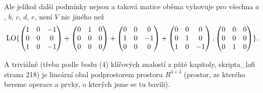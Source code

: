 \documentclass[12pt]{article}					%
\begin{document}
\begin{priklad}[6.1]
\begin{reseni}
            Ale jelikož další podmínky nejsou a taková matice oběma vyhovuje pro všechna $a$, $b$, $c$, $d$, $e$, není $V$ nic jiného než
            $$ \operatorname{LO}\{\begin{pmatrix} 1 & 0 & -1 \\ 0 & 0 & 0 \\ 1 & 0 & -1  \end{pmatrix} + \begin{pmatrix} 0 & 1 & 0 \\ 0 & 0 & 0 \\ 0 & 0 & 0 \end{pmatrix} + \begin{pmatrix} 0 & 0 & 0 \\ 1 & 0 & -1 \\ 0 & 0 & 0 \end{pmatrix} + \begin{pmatrix} 0 & 0 & 0 \\ 0 & 1 & 0 \\ 1 & 0 & -1  \end{pmatrix}, \begin{pmatrix} 0 & 0 & 0 \\ 0 & 0 & 0 \\ 0 & 1 & 0 \end{pmatrix}\}. $$

            A triviálně (třeba podle bodu (4) klíčových znalostí z páté kapitoly, skripta\_la6 strana 218) je lineární obal podprostorem prostoru $R^{3 \times 3}$ (prostor, ze kterého bereme operace a prvky, o kterých jsme se tu bavili).
        \end{reseni}
    \end{priklad}

\pagebreak
\end{document}

